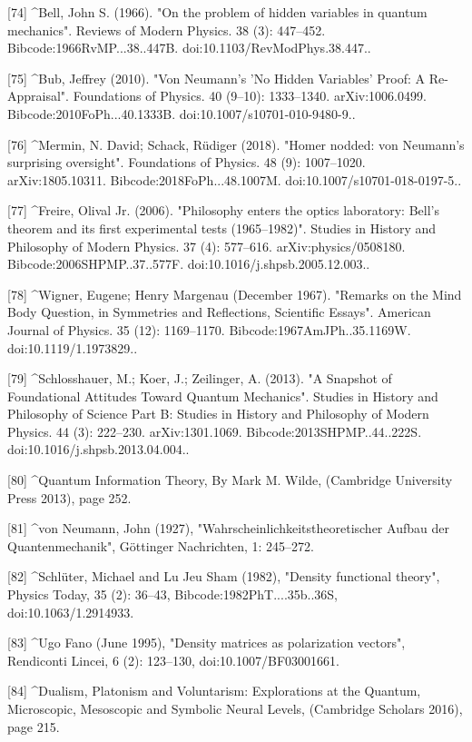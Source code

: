 [74]
^Bell, John S. (1966). "On the problem of hidden variables in quantum mechanics". Reviews of Modern Physics. 38 (3): 447–452. Bibcode:1966RvMP...38..447B. doi:10.1103/RevModPhys.38.447..

[75]
^Bub, Jeffrey (2010). "Von Neumann's 'No Hidden Variables' Proof: A Re-Appraisal". Foundations of Physics. 40 (9–10): 1333–1340. arXiv:1006.0499. Bibcode:2010FoPh...40.1333B. doi:10.1007/s10701-010-9480-9..

[76]
^Mermin, N. David; Schack, Rüdiger (2018). "Homer nodded: von Neumann's surprising oversight". Foundations of Physics. 48 (9): 1007–1020. arXiv:1805.10311. Bibcode:2018FoPh...48.1007M. doi:10.1007/s10701-018-0197-5..

[77]
^Freire, Olival Jr. (2006). "Philosophy enters the optics laboratory: Bell's theorem and its first experimental tests (1965–1982)". Studies in History and Philosophy of Modern Physics. 37 (4): 577–616. arXiv:physics/0508180. Bibcode:2006SHPMP..37..577F. doi:10.1016/j.shpsb.2005.12.003..

[78]
^Wigner, Eugene; Henry Margenau (December 1967). "Remarks on the Mind Body Question, in Symmetries and Reflections, Scientific Essays". American Journal of Physics. 35 (12): 1169–1170. Bibcode:1967AmJPh..35.1169W. doi:10.1119/1.1973829..

[79]
^Schlosshauer, M.; Koer, J.; Zeilinger, A. (2013). "A Snapshot of Foundational Attitudes Toward Quantum Mechanics". Studies in History and Philosophy of Science Part B: Studies in History and Philosophy of Modern Physics. 44 (3): 222–230. arXiv:1301.1069. Bibcode:2013SHPMP..44..222S. doi:10.1016/j.shpsb.2013.04.004..

[80]
^Quantum Information Theory, By Mark M. Wilde, (Cambridge University Press 2013), page 252.

[81]
^von Neumann, John (1927), "Wahrscheinlichkeitstheoretischer Aufbau der Quantenmechanik", Göttinger Nachrichten, 1: 245–272.

[82]
^Schlüter, Michael and Lu Jeu Sham (1982), "Density functional theory", Physics Today, 35 (2): 36–43, Bibcode:1982PhT....35b..36S, doi:10.1063/1.2914933.

[83]
^Ugo Fano (June 1995), "Density matrices as polarization vectors", Rendiconti Lincei, 6 (2): 123–130, doi:10.1007/BF03001661.

[84]
^Dualism, Platonism and Voluntarism: Explorations at the Quantum, Microscopic, Mesoscopic and Symbolic Neural Levels, (Cambridge Scholars 2016), page 215.


